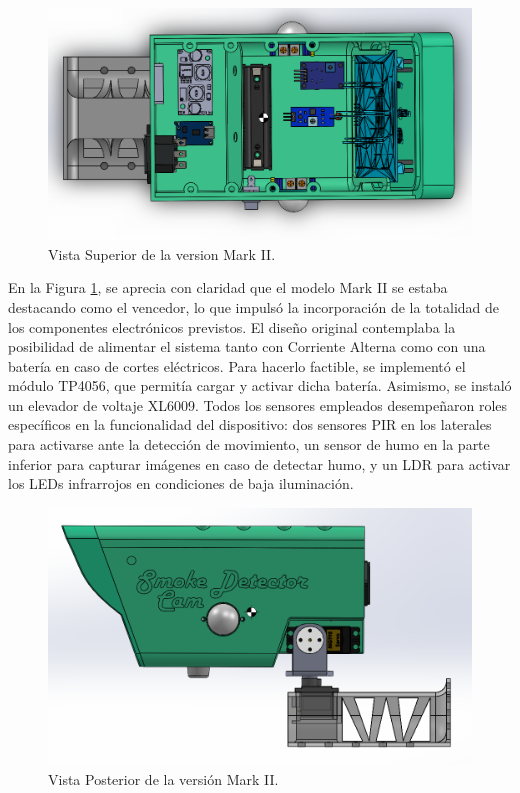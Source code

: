     \begin{figure}[H]
    \centering
    \begin{adjustbox}{width=\linewidth/2}
      \includegraphics{media/superior_Mark02.png}
    \end{adjustbox}
    \caption{\label{fig:superior_Mark02}Vista Superior de la version Mark II.}
    \end{figure}    

    En la Figura \ref{fig:superior_Mark02}, se aprecia con claridad que el modelo Mark II se estaba destacando como el vencedor, lo que impulsó la incorporación de la totalidad de los componentes electrónicos previstos. El diseño original contemplaba la posibilidad de alimentar el sistema tanto con Corriente Alterna como con una batería en caso de cortes eléctricos. Para hacerlo factible, se implementó el módulo TP4056, que permitía cargar y activar dicha batería. Asimismo, se instaló un elevador de voltaje XL6009. Todos los sensores empleados desempeñaron roles específicos en la funcionalidad del dispositivo: dos sensores PIR en los laterales para activarse ante la detección de movimiento, un sensor de humo en la parte inferior para capturar imágenes en caso de detectar humo, y un LDR para activar los LEDs infrarrojos en condiciones de baja iluminación.

    \begin{figure}[H]
    \centering
    \begin{adjustbox}{width=\linewidth/2}
      \includegraphics{media/posterior_Mark02.png}
    \end{adjustbox}
    \caption{\label{fig:posterior_Mark02}Vista Posterior de la versión Mark II.}
    \end{figure}

